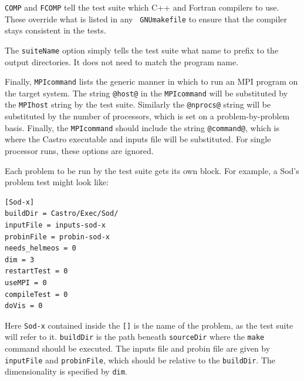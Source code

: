 {\tt COMP} and {\tt FCOMP} tell the test suite which C++ and Fortran
compilers to use.  These override what is listed in any {\tt
  GNUmakefile} to ensure that the compiler stays consistent in the
tests.

The {\tt suiteName} option simply tells the test suite what name to
prefix to the output directories.  It does not need to match the
program name.  

Finally, {\tt MPIcommand} lists the generic manner in which to run an
MPI program on the target system.  The string {\tt @host@} in the
{\tt MPIcommand} will be substituted by the {\tt MPIhost} string by
the test suite.  Similarly the {\tt @nprocs@} string will be
substituted by the number of processors, which is set on a
problem-by-problem basis.  Finally, the {\tt MPIcommand} should
include the string {\tt @command@}, which is where the Castro
executable and inputs file will be substituted.  For single processor
runs, these options are ignored.

Each problem to be run by the test suite gets its own block.  For
example, a Sod's problem test might look like:

\begin{verbatim}
[Sod-x]
buildDir = Castro/Exec/Sod/
inputFile = inputs-sod-x
probinFile = probin-sod-x
needs_helmeos = 0
dim = 3
restartTest = 0
useMPI = 0
compileTest = 0
doVis = 0
\end{verbatim}

Here {\tt Sod-x} contained inside the {\tt []} is the name of the problem, as the 
test suite will refer to it.  {\tt buildDir} is the path beneath {\tt sourceDir} 
where the {\tt make} command should be executed.  The inputs file and probin file
are given by {\tt inputFile} and {\tt probinFile}, which should be relative
to the {\tt buildDir}.  The dimensionality is specified by {\tt dim}.

